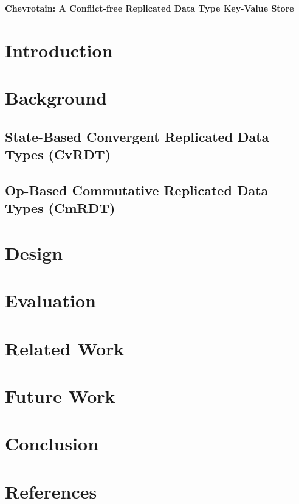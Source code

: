 \documentclass[12pt]{article}
\title{\textbf{{\vspace{-10ex}}}}
\author{\vspace{-10ex}}
\date{\vspace{-10ex}}
\begin{document}
\abovedisplayskip=5pt
\belowdisplayskip=5pt

\begin{center}
{\Large\textbf{Chevrotain: A Conflict-free Replicated Data Type Key-Value Store}}
\end{center}

\section{Introduction}


\newpage
\section{Background}
\subsection{State-Based Convergent Replicated Data Types (CvRDT)}
\subsection{Op-Based Commutative Replicated Data Types (CmRDT)}

\newpage
\section{Design} %

\newpage
\section{Evaluation}

\newpage
\section{Related Work}

\newpage
\section{Future Work}

\newpage
\section{Conclusion}

\newpage
\section*{References}
\end{document}
